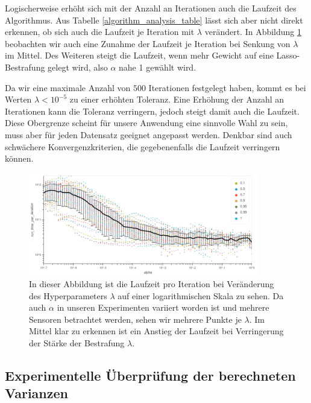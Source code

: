 Logischerweise erhöht sich mit der Anzahl an Iterationen auch die Laufzeit des Algorithmus. Aus Tabelle \ref{algorithm_analysis_table} lässt sich aber nicht direkt erkennen, ob sich auch die Laufzeit je Iteration mit $\lambda$ verändert. In Abbildung \ref{run_time_per_iteration} beobachten wir auch eine Zunahme der Laufzeit je Iteration bei Senkung von $\lambda$ im Mittel. Des Weiteren steigt die Laufzeit, wenn mehr Gewicht auf eine Lasso-Bestrafung gelegt wird, also $\alpha$ nahe 1 gewählt wird.

Da wir eine maximale Anzahl von $500$ Iterationen festgelegt haben, kommt es bei Werten $\lambda < 10^{-5}$ zu einer erhöhten Toleranz. Eine Erhöhung der Anzahl an Iterationen kann die Toleranz verringern, jedoch steigt damit auch die Laufzeit. Diese Obergrenze scheint für unsere Anwendung eine sinnvolle Wahl zu sein, muss aber für jeden Datensatz geeignet angepasst werden. Denkbar sind auch schwächere Konvergenzkriterien, die gegebenenfalls die Laufzeit verringern können.

\begin{figure}
\centering
\includegraphics[width = 0.9\textwidth]{figures/run_time_per_iteration.png}
\caption{In dieser Abbildung ist die Laufzeit pro Iteration bei Veränderung des Hyperparameters $\lambda$ auf einer logarithmischen Skala zu sehen. Da auch $\alpha$ in unseren Experimenten variiert worden ist und mehrere Sensoren betrachtet werden, sehen wir mehrere Punkte je $\lambda$. Im Mittel klar zu erkennen ist ein Anstieg der Laufzeit bei Verringerung der Stärke der Bestrafung $\lambda$.}
\label{run_time_per_iteration}
\end{figure}




\subsection{Experimentelle Überprüfung der berechneten Varianzen}

